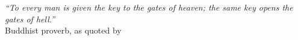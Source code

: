 


\begin{epigrafe}

\vspace*{\fill}
{
    \begin{flushright}
        \textit{``To every man is given the key to the gates of heaven; the same key opens the gates of hell.''} \\ Buddhist proverb, as quoted by \textcite[p.~13]{feynmanValueScience1955}
    \end{flushright}
}

\end{epigrafe}

